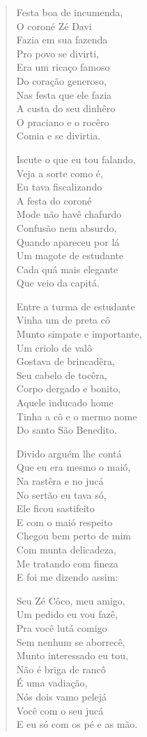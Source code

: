 \begin{verse}
Festa boa de incumenda,\\
O coroné Zé Davi\\
Fazia em sua fazenda\\
Pro povo se divirti,\\
Era um ricaço famoso\\
Do coração generoso,\\
Nas festa que ele fazia\\
A custa do seu dinhêro\\
O praciano e o rocêro\\
Comia e se divirtia.

Iscute o que eu tou falando,\\
Veja a sorte como é,\\
Eu tava fiscalizando\\
A festa do coroné\\
Mode não havê chafurdo\\
Confusão nem absurdo,\\
Quando apareceu por lá\\
Um magote de estudante\\
Cada quá mais elegante\\
Que veio da capitá.

Entre a turma de estudante\\
Vinha um de preta cô\\
Munto simpate e importante,\\
Um criolo de valô\\
Gostava de brincadêra,\\
Seu cabelo de tocêra,\\
Corpo dergado e bonito,\\
Aquele inducado home\\
Tinha a cô e o mermo nome\\
Do santo São Benedito.

Divido arguém lhe contá\\
Que eu era mesmo o maió,\\
Na rastêra e no jucá\\
No sertão eu tava só,\\
Ele ficou sastifeito\\
E com o maió respeito\\
Chegou bem perto de mim\\
Com munta delicadeza,\\
Me tratando com fineza\\
E foi me dizendo assim:

Seu Zé Côco, meu amigo,\\
Um pedido eu vou fazê,\\
Pra você lutá comigo\\
Sem nenhum se aborrecê,\\
Munto interessado eu tou,\\
Não é briga de rancô\\
É uma vadiação,\\
Nós dois vamo pelejá\\
Você com o seu jucá\\
E eu só com os pé e as mão.


\end{verse}
